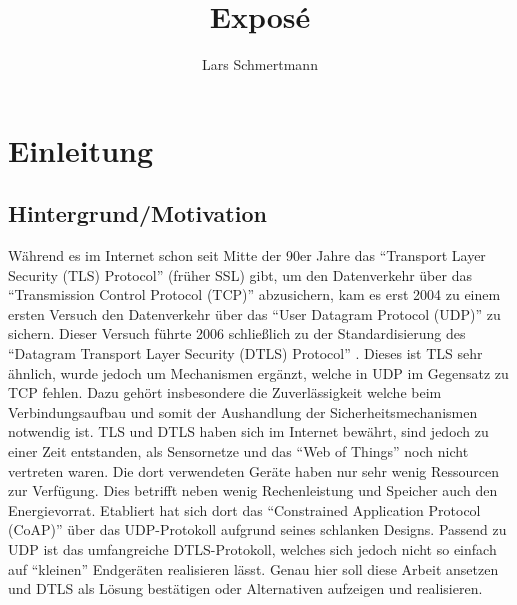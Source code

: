 \documentclass[a4paper,10pt]{report}
\title{Exposé}
\author{Lars Schmertmann}
\begin{document}
\maketitle


\tableofcontents
\clearpage

\chapter{Einleitung}

\section{Hintergrund/Motivation}
Während es im Internet schon seit Mitte der 90er Jahre das  "`Transport Layer Security (TLS) Protocol"' \cite{rfc5246} (früher SSL) gibt,
um den Datenverkehr über das "`Transmission Control Protocol (TCP)"' abzusichern, kam es erst 2004 zu einem ersten Versuch den Datenverkehr
über das "`User Datagram Protocol (UDP)"' zu sichern. Dieser Versuch führte 2006 schließlich zu der Standardisierung des "`Datagram Transport
Layer Security (DTLS) Protocol"' \cite{rfc6347}. Dieses ist TLS sehr ähnlich, wurde jedoch um Mechanismen ergänzt, welche in UDP im Gegensatz
zu TCP fehlen. Dazu gehört insbesondere die Zuverlässigkeit welche beim Verbindungsaufbau und somit der Aushandlung der Sicherheitsmechanismen
notwendig ist. TLS und DTLS haben sich im Internet bewährt, sind jedoch zu einer Zeit entstanden, als Sensornetze und das
"`Web of Things"' noch nicht vertreten waren. Die dort verwendeten Geräte haben nur sehr wenig Ressourcen zur Verfügung.
Dies betrifft neben wenig Rechenleistung und Speicher auch den Energievorrat. Etabliert hat sich dort das "`Constrained
Application Protocol (CoAP)"' \cite{draftcoap} über das UDP-Protokoll aufgrund seines schlanken Designs. Passend zu UDP ist
das umfangreiche DTLS-Protokoll, welches sich jedoch nicht so einfach auf "`kleinen"' Endgeräten realisieren lässt.
Genau hier soll diese Arbeit ansetzen und DTLS als Lösung bestätigen oder Alternativen aufzeigen und realisieren.

\end{document}
